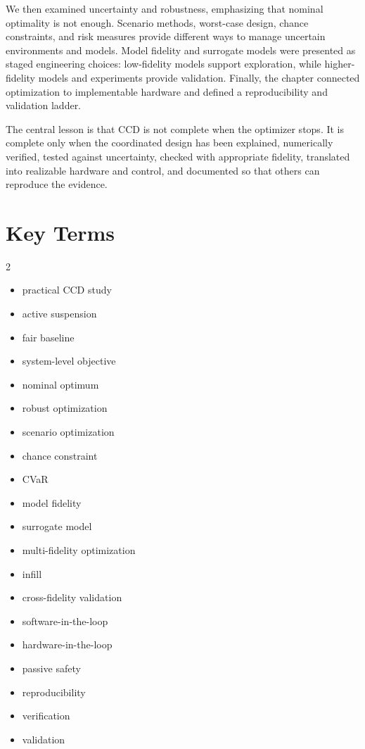 \documentclass[11pt]{article}
\begin{document}
We then examined uncertainty and robustness, emphasizing that nominal optimality is not enough. Scenario methods, worst-case design, chance constraints, and risk measures provide different ways to manage uncertain environments and models. Model fidelity and surrogate models were presented as staged engineering choices: low-fidelity models support exploration, while higher-fidelity models and experiments provide validation. Finally, the chapter connected optimization to implementable hardware and defined a reproducibility and validation ladder.

The central lesson is that CCD is not complete when the optimizer stops. It is complete only when the coordinated design has been explained, numerically verified, tested against uncertainty, checked with appropriate fidelity, translated into realizable hardware and control, and documented so that others can reproduce the evidence.

\section{Key Terms}

\begin{multicols}{2}
\begin{itemize}[leftmargin=1.4em,itemsep=0.25em]
  \item practical CCD study
  \item active suspension
  \item fair baseline
  \item system-level objective
  \item nominal optimum
  \item robust optimization
  \item scenario optimization
  \item chance constraint
  \item CVaR
  \item model fidelity
  \item surrogate model
  \item multi-fidelity optimization
  \item infill
  \item cross-fidelity validation
  \item software-in-the-loop
  \item hardware-in-the-loop
  \item passive safety
  \item reproducibility
  \item verification
  \item validation
\end{itemize}
\end{multicols}
\end{document}
